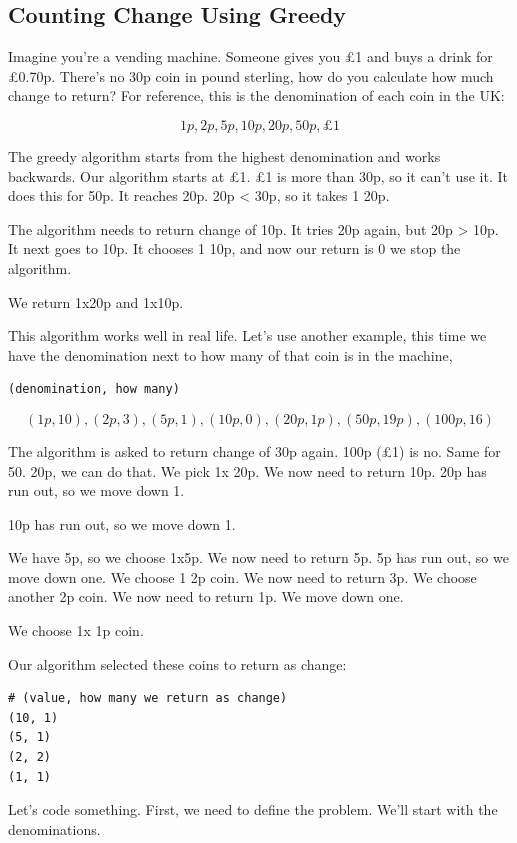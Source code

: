\documentclass{article}
\begin{document}
\subsection{Counting Change Using Greedy}
Imagine you're a vending machine. Someone gives you £1 and buys a drink for £0.70p. There's no 30p coin in pound sterling, how do you calculate how much change to return?
For reference, this is the denomination of each coin in the UK:

$$1p, 2p, 5p, 10p, 20p, 50p, \pounds 1$$

The greedy algorithm starts from the highest denomination and works backwards. Our algorithm starts at £1. £1 is more than 30p, so it can't use it. It does this for 50p. It reaches 20p. 20p < 30p, so it takes 1 20p.

The algorithm needs to return change of 10p. It tries 20p again, but 20p > 10p. It next goes to 10p. It chooses 1 10p, and now our return is 0 we stop the algorithm.

We return 1x20p and 1x10p.

This algorithm works well in real life. Let's use another example, this time we have the denomination next to how many of that coin is in the machine, 

\begin{verbatim}
(denomination, how many)
\end{verbatim}
$$(1p, 10), (2p, 3), (5p, 1), (10p, 0), (20p, 1p), (50p, 19p), (100p, 16)$$

The algorithm is asked to return change of 30p again. 100p (£1) is no. Same for 50. 20p, we can do that. We pick 1x 20p. We now need to return 10p. 20p has run out, so we move down 1.

10p has run out, so we move down 1.

We have 5p, so we choose 1x5p. We now need to return 5p. 5p has run out, so we move down one.
We choose 1 2p coin. We now need to return 3p. We choose another 2p coin. We now need to return 1p. We move down one.

We choose 1x 1p coin. 

Our algorithm selected these coins to return as change:

\begin{verbatim}
# (value, how many we return as change)
(10, 1)
(5, 1)
(2, 2)
(1, 1)
\end{verbatim}
 
 Let's code something. First, we need to define the problem. We'll start with the denominations.
 
\end{document}
